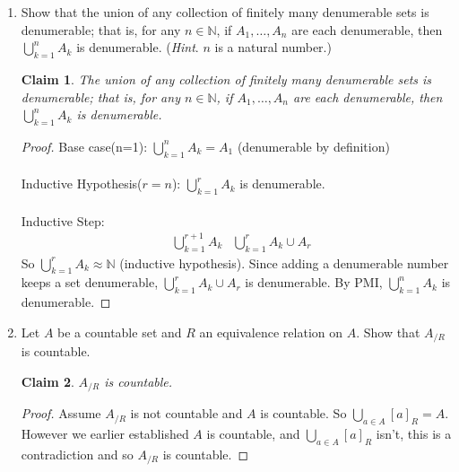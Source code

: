 \documentclass[11pt]{letter}
\newtheorem{claim}{Claim}
\theoremstyle{definition}
\begin{document}
\begin{description}
\begin{enumerate}
		\item Show that the union of any collection of finitely many denumerable sets is denumerable; that is, for any $n\in\mathbb{N}$, if $A_1,\ldots,A_n$ are each denumerable, then $\displaystyle\bigcup_{k=1}^nA_k$ is denumerable. ({\em Hint}. $n$ is a natural number.)
                  \begin{claim}
                    The union of any collection of finitely many denumerable sets is denumerable; that is, for any $n\in\mathbb{N}$, if $A_1,\ldots,A_n$ are each denumerable, then $\displaystyle\bigcup_{k=1}^nA_k$ is denumerable.
                  \end{claim}
                  \begin{proof}
                    Base case(n=1): $\displaystyle\bigcup_{k=1}^nA_k=A_1$ (denumerable by definition) \\ \\
                    Inductive Hypothesis($r=n$): $\displaystyle\bigcup_{k=1}^rA_k$ is denumerable.\\ \\
                    Inductive Step:
                    \begin{align*}
                      &\displaystyle\bigcup_{k=1}^{r+1}A_k
                        &\displaystyle\bigcup_{k=1}^rA_k\cup A_r
                    \end{align*}
                    So $\displaystyle\bigcup_{k=1}^rA_k\approx \mathbb{N}$ (inductive hypothesis). Since adding a denumerable number keeps a set denumerable, $\displaystyle\bigcup_{k=1}^rA_k\cup A_r$ is denumerable. By PMI, $\displaystyle\bigcup_{k=1}^nA_k$ is denumerable.
                  \end{proof}
                  
                  
		
		\item Let $A$ be a countable set and $R$ an equivalence relation on $A$. Show that $A_{/R}$ is countable.
                  \begin{claim}
                    $A_{/R}$ is countable.
                  \end{claim}
                  \begin{proof}
                    Assume $A_{/R}$ is not countable and $A$ is countable. So $\bigcup_{a\in A}[a]_R=A$. However we earlier established $A$ is countable, and $\bigcup_{a\in A}[a]_R$ isn't, this is a contradiction and so $A_{/R}$ is countable.
                    \end{proof}
                    

\end{enumerate}
\end{description}
\end{document}
